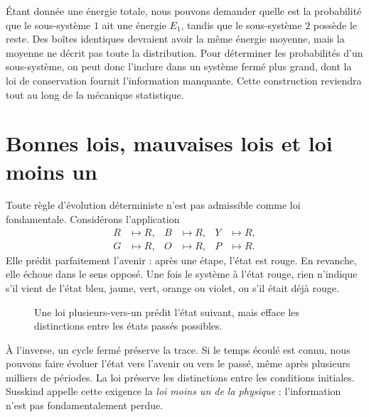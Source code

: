 Étant donnée une énergie totale, nous pouvons demander quelle est la probabilité que le sous-système \(1\) ait une énergie \(E_1\), tandis que le sous-système \(2\) possède le reste. Des boîtes identiques devraient avoir la même énergie moyenne, mais la moyenne ne décrit pas toute la distribution. Pour déterminer les probabilités d’un sous-système, on peut donc l’inclure dans un système fermé plus grand, dont la loi de conservation fournit l’information manquante. Cette construction reviendra tout au long de la mécanique statistique.

\section{Bonnes lois, mauvaises lois et loi moins un}

Toute règle d’évolution déterministe n’est pas admissible comme loi fondamentale. Considérons l’application
\begin{equation}
 \begin{aligned}
 R&\mapsto R,& B&\mapsto R,& Y&\mapsto R,\\
 G&\mapsto R,& O&\mapsto R,& P&\mapsto R.
 \end{aligned}
 \label{eq:sm1-all-to-red}
\end{equation}
Elle prédit parfaitement l’avenir : après une étape, l’état est rouge. En revanche, elle échoue dans le sens opposé. Une fois le système à l’état rouge, rien n’indique s’il vient de l’état bleu, jaune, vert, orange ou violet, ou s’il était déjà rouge.

\begin{figure}[htbp]
\centering
{}
Une loi plusieurs-vers-un prédit l’état suivant, mais efface les distinctions entre les états passés possibles.\caption{
}
\label{fig:sm1-bad-law}
\end{figure}

À l’inverse, un cycle fermé préserve la trace. Si le temps écoulé est connu, nous pouvons faire évoluer l’état vers l’avenir ou vers le passé, même après plusieurs milliers de périodes. La loi préserve les distinctions entre les conditions initiales. Susskind appelle cette exigence la \emph{loi moins un de la physique} : l’information n’est pas fondamentalement perdue.

